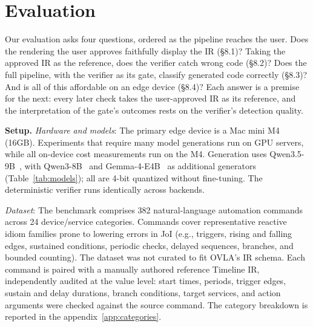 \documentclass[sigconf,nonacm,anonymous,review]{acmart}
\begin{document}
\section{Evaluation}

Our evaluation asks four questions, ordered as the pipeline reaches the user. Does the rendering the user approves faithfully display the IR (\S8.1)? Taking the approved IR as the reference, does the verifier catch wrong code (\S8.2)? Does the full pipeline, with the verifier as its gate, classify generated code correctly (\S8.3)? And is all of this affordable on an edge device (\S8.4)? Each answer is a premise for the next: every later check takes the user-approved IR as its reference, and the interpretation of the gate's outcomes rests on the verifier's detection quality.

\textbf{Setup.} \emph{Hardware and models}: The primary edge device is a Mac mini M4 (16GB). Experiments that require many model generations run on GPU servers, while all on-device cost measurements run on the M4. Generation uses Qwen3.5-9B~\cite{qwen35}, with Qwen3-8B~\cite{qwen3} and Gemma-4-E4B~\cite{gemma4} as additional generators (Table~\ref{tab:models}); all are 4-bit quantized without fine-tuning. The deterministic verifier runs identically across backends.

\emph{Dataset}: The benchmark comprises 382 natural-language automation commands across 24 device/service categories. Commands cover representative reactive idiom families prone to lowering errors in JoI (e.g.,
triggers, rising and falling edges, sustained conditions, periodic checks, delayed sequences, branches, and bounded counting). The dataset was not curated to fit OVLA's IR schema. %
Each command is paired with a manually authored reference Timeline IR, independently audited at the value level: start times, periods, trigger edges, sustain and delay durations, branch conditions, target services, and action arguments were checked against the source command. The category breakdown is reported in the appendix~\ref{app:categories}.

\end{document}
